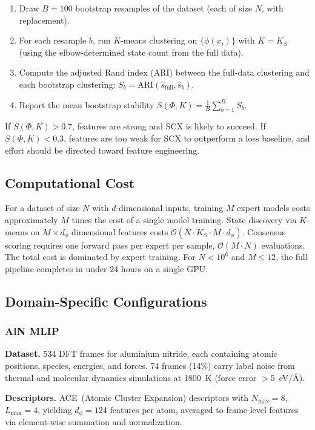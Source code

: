 \begin{enumerate}
	\item Draw $B = 100$ bootstrap resamples of the dataset (each of size $N$, with replacement).
	\item For each resample $b$, run $K$-means clustering on $\{\phi(x_i)\}$ with $K = K_S$ (using the elbow-determined state count from the full data).
	\item Compute the adjusted Rand index (ARI) between the full-data clustering and each bootstrap clustering: $S_b = \text{ARI}(\hat{s}_{\text{full}}, \hat{s}_b)$.
	\item Report the mean bootstrap stability $S(\Phi, K) = \frac{1}{B} \sum_{b=1}^B S_b$.
\end{enumerate}

If $S(\Phi, K) > 0.7$, features are strong and SCX is likely to succeed. If $S(\Phi, K) < 0.3$, features are too weak for SCX to outperform a loss baseline, and effort should be directed toward feature engineering.

\subsection{Computational Cost}

For a dataset of size $N$ with $d$-dimensional inputs, training $M$ expert models costs approximately $M$ times the cost of a single model training. State discovery via $K$-means on $M \times d_\phi$ dimensional features costs $\mathcal{O}(N \cdot K_S \cdot M \cdot d_\phi)$. Consensus scoring requires one forward pass per expert per sample, $\mathcal{O}(M \cdot N)$ evaluations. The total cost is dominated by expert training. For $N < 10^6$ and $M \leq 12$, the full pipeline completes in under 24 hours on a single GPU.

\subsection{Domain-Specific Configurations}

\subsubsection{AlN MLIP}
\textbf{Dataset.} 534 DFT frames for aluminium nitride, each containing atomic positions, species, energies, and forces. 74 frames (14\%) carry label noise from thermal and molecular dynamics simulations at 1800~K (force error $> 5$~eV/{\AA}).

\textbf{Descriptors.} ACE~(Atomic Cluster Expansion) descriptors with $N_{\text{max}} = 8$, $L_{\text{max}} = 4$, yielding $d_\phi = 124$ features per atom, averaged to frame-level features via element-wise summation and normalization.

